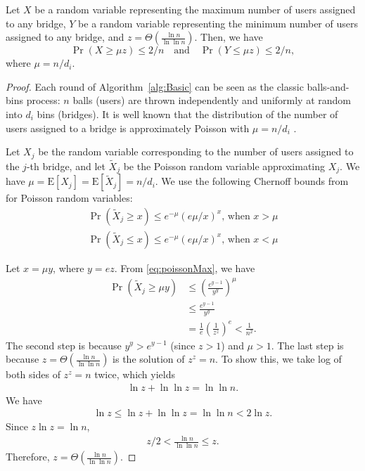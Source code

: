 \documentclass[a4paper,UKenglish]{lipics-v2016}
\newcommand{\E}{\mathbf{\mathrm{E}}}
\newcommand{\sfsize}{\fontsize{0.68\baselineskip}{0.68\baselineskip}\selectfont}
\newcommand{\sans}[1]{\textbf{\textsf{\sfsize \mbox{#1}}}}
\begin{document}
\begin{lemma}[\sans{Bridge Load-Balancing}]
	Let $X$ be a random variable representing the maximum number of users assigned to any bridge, $Y$ be a random variable representing the minimum number of users assigned to any bridge, and $z = \Theta\left(\frac{\ln{n}}{\ln{\ln{n}}}\right)$. Then, we have 
	\[
	\Pr\left(X \geq \mu z\right) \leq 2/n \quad \text{and} \quad 
	\Pr\left(Y \leq \mu z\right) \leq 2/n,
	\]
	where ${\mu = n/d_i}$.
\end{lemma}
\begin{proof}
	Each round of Algorithm~\ref{alg:Basic} can be seen as the classic balls-and-bins process: $n$ balls (users) are thrown independently and uniformly at random into $d_i$ bins (bridges). It is well known that the distribution of the number of users assigned to a bridge is approximately Poisson with ${\mu = n/d_i}$ \cite[Chapter~5]{Michael2005}.
	
	Let $X_j$ be the random variable corresponding to the number of users assigned to the $j$-th bridge, and let $\tilde{X}_j$ be the Poisson random variable approximating $X_j$. We have ${\mu = \E[X_j] = \E[\tilde{X}_j] = n/d_i}$. We use the following Chernoff bounds from \cite[Chapter~5]{Michael2005} for Poisson random variables:
	\begin{align}
	\Pr(\tilde{X}_j \geq x) \leq e^{-\mu}(e\mu/x)^x \text{, when } x > \mu \label{eq:poissonMax}\\
	\Pr(\tilde{X}_j \leq x) \leq e^{-\mu}(e\mu/x)^x \text{, when } x < \mu \label{eq:poissonMin}
	\end{align}
	
	\noindent Let ${x = \mu y}$, where ${y = ez}$. From \eqref{eq:poissonMax}, we have
	\begin{align}
	\Pr(\tilde{X}_j \geq \mu y) &\leq \left(\frac{e^{y-1}}{y^y}\right)^\mu \nonumber \\
	&\leq \frac{e^{y-1}}{y^y} \nonumber \\ 
	&= \frac{1}{e}\left(\frac{1}{z^z}\right)^e < \frac{1}{n^2}. \label{eq:approxBound}
	\end{align}
	The second step is because ${y^y > e^{y-1}}$ (since ${z > 1}$) and ${\mu > 1}$. The last step is because ${z = \Theta\left(\frac{\ln{n}}{\ln{\ln{n}}}\right)}$ is the solution of ${z^z = n}$. To show this, we take log of both sides of ${z^z = n}$ twice, which yields
	\begin{align*}
	\ln{z} + \ln{\ln{z}} = \ln{\ln{n}}.
	\end{align*}
	We have
	\begin{align*}
	\ln{z} \leq \ln{z} + \ln{\ln{z}} = \ln{\ln{n}} < 2\ln{z}.
	\end{align*}
	Since $z\ln{z} = \ln{n}$,
	\begin{align*}
	z/2 < \frac{\ln{n}}{\ln{\ln{n}}} \leq z.
	\end{align*}
	Therefore, $z = \Theta\left(\frac{\ln{n}}{\ln{\ln{n}}}\right)$. 
	

\end{proof}
\end{document}
